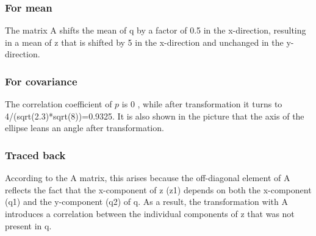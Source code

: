 \subsubsection{For mean}

The matrix A shifts the mean of q by a factor of 0.5 in the x-direction, resulting in a mean of z that is shifted by 5 in the x-direction and unchanged in the y-direction.

\subsubsection{For covariance}
The correlation coefficient of $ p $ is $ 0 $ , while after transformation it turns to 4/(sqrt(2.3)*sqrt(8))=0.9325. It is also shown in the picture that the axis of the ellipse leans an angle after transformation.

\subsubsection{Traced back}
According to the A matrix, this arises because the off-diagonal element of A reflects the fact that the x-component of z (z1) depends on both the x-component (q1) and the y-component (q2) of q. As a result, the transformation with A introduces a correlation between the individual components of z that was not present in q.



